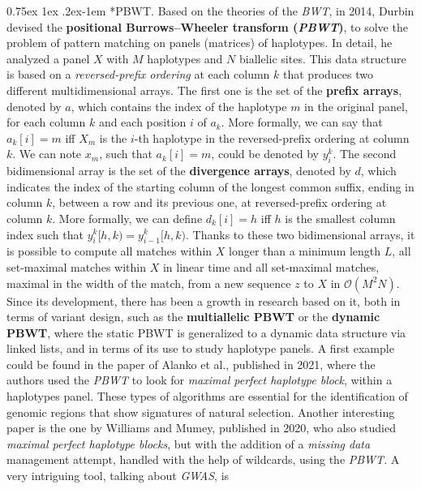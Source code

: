 \documentclass[a4paper,11pt, oneside]{article}
\makeatletter
\renewcommand{\paragraph}{%
  \@startsection{paragraph}{4}%
  {\z@}{0.75ex \@plus 1ex \@minus .2ex}{-1em}%
  {\normalfont\normalsize\bfseries}%
}
\makeatother
\begin{document}
\paragraph*{PBWT.}
Based on the theories of the \textit{BWT}, in 2014, Durbin devised the
\textbf{positional Burrows–Wheeler transform (\textit{PBWT})}, to
solve the problem of pattern matching on panels (matrices) of haplotypes. In
detail, he analyzed a panel $X$ with $M$ haplotypes and $N$ biallelic
sites. This data structure is based on a \textit{reversed-prefix ordering} at
each column $k$ that produces two different multidimensional arrays. The first
one is the set of the \textbf{prefix arrays}, denoted by $a$, which contains the
index of the haplotype $m$ in the original panel, for each column $k$ and
each position $i$ of $a_k$. More formally, we can say that $a_k[i]=m$ iff $X_m$
is the $i$-th haplotype in the reversed-prefix ordering at column $k$. We can
note $x_m$, such that $a_k[i]=m$, could be denoted by $y_i^k$. The second
bidimensional array is the set of the \textbf{divergence arrays}, denoted by
$d$, which indicates the index of the starting column of the longest common
suffix, ending in column $k$, between a row and its previous one, at
reversed-prefix ordering at column $k$. More formally, we can define $d_k[i]=h$
iff $h$ is the smallest column index such that $y_i^k[h,k)=y_{i-1}^k[h,k)$. 
Thanks to these two bidimensional arrays, it is possible to compute all matches
within $X$ longer than a minimum length $L$, all set-maximal matches within $X$
in linear time and all set-maximal matches, maximal in the width of the match,
from a new sequence $z$ to $X$ in $\mathcal{O}(M^2N)$.
Since its development, there has been a growth in
research based on it, both in terms of variant design, such as the
\textbf{multiallelic PBWT} or the \textbf{dynamic PBWT}, where the static PBWT
is generalized to a dynamic data 
structure via linked lists, and in terms of its use to study haplotype panels.
A first example could be found in the paper of Alanko et al., published in
2021, where the authors used the \textit{PBWT} to look for \textit{maximal
  perfect haplotype block}, within a haplotypes panel. These types of
algorithms are essential for the identification of genomic regions that show
signatures of natural selection.
Another interesting paper is the one by Williams and Mumey, published in 2020,
who also studied \textit{maximal perfect haplotype blocks}, but with the
addition of a \textit{missing data} management attempt, handled with the help of
wildcards, using the \textit{PBWT}. 
A very intriguing tool, talking about \textit{GWAS}, is
\end{document}
